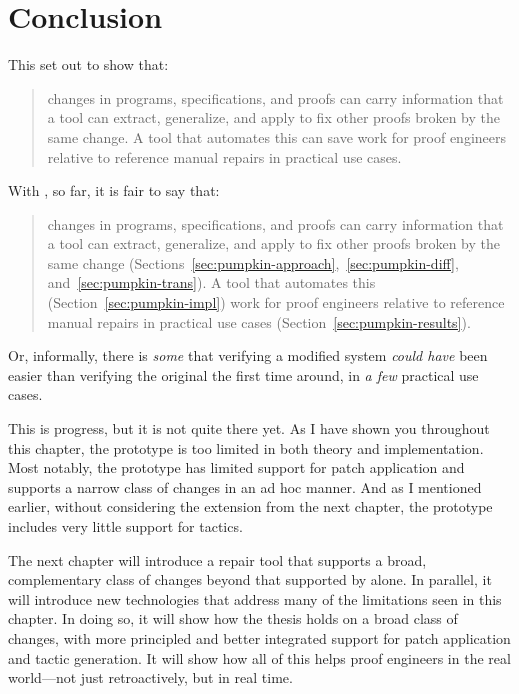 \section{Conclusion}
\label{sec:pumpkin-concl}

This  set out to show that:

\begin{quote}
changes in programs, specifications, and proofs can carry information that a tool can extract, generalize, and apply to fix other proofs broken by the same change. A tool that automates this can save work for proof engineers relative to reference manual repairs in practical use cases.
\end{quote}
With \sysname, so far, it is fair to say that:

\begin{quote}
changes in  programs, specifications, and proofs can carry information that a tool can extract, generalize, and  apply to fix other proofs broken by the same change (Sections~\ref{sec:pumpkin-approach},~\ref{sec:pumpkin-diff}, and~\ref{sec:pumpkin-trans}). A tool that automates this (Section~\ref{sec:pumpkin-impl})  work for proof engineers relative to reference manual repairs in  practical use cases (Section~\ref{sec:pumpkin-results}).
\end{quote}
Or, informally, there is \textit{some}  that verifying a modified system \textit{could have} been easier than verifying the original the first time around,
in \textit{a few} practical use cases.

This is progress, but it is not quite there yet.
As I have shown you throughout this chapter, the \sysname prototype is too limited in both theory and implementation.
Most notably, the \sysname prototype has limited support for patch application and supports
a narrow class of changes in an ad hoc manner.
And as I mentioned earlier, without considering the extension from the next chapter, 
the \sysname prototype includes very little support for tactics.

The next chapter will introduce a repair tool that supports a broad, complementary class of changes beyond that supported
by \sysname alone.
In parallel, it will introduce new technologies that address many of the limitations seen in this chapter.
In doing so, it will show how the thesis holds on a broad class of changes,
with more principled and better integrated support for patch application and tactic generation.
It will show how all of this helps proof engineers in the real world---not just retroactively,
but in real time.





